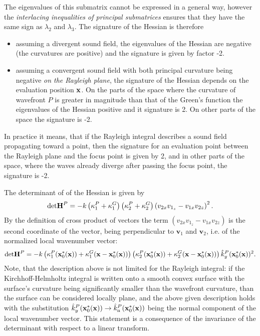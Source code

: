 The eigenvalues of this submatrix cannot be expressed in a general way, however the \emph{interlacing inequalities of principal submatrices}
ensures that they have the same sign as $\lambda_2$ and $\lambda_3$.
The signature of the Hessian is therefore 
\begin{itemize}
\item assuming a divergent sound field, the eigenvalues of the Hessian are negative (the curvatures are positive) and the signature is given by factor -2.
\item assuming a convergent sound field with both principal curvature being negative \emph{on the Rayleigh plane}, the signature of the Hessian depends on the evaluation position $\mathbf{x}$.
On the parts of the space where the curvature of wavefront $P$ is greater in magnitude than that of the Green's function the eigenvalues of the Hessian positive and it signature is 2.
On other parts of the space the signature is -2.
\end{itemize}
In practice it means, that if the Rayleigh integral describes a sound field propagating toward a point, then the signature for an evaluation point between the Rayleigh plane and the focus point is given by 2, and in other parts of the space, where the waves already diverge after passing the focus point, the signature is -2.

The determinant of of the Hessian is given by
\begin{equation}
\mathrm{det} \mathbf{H}^P  = -k \left( \kappa_1^P+\kappa_1^G \right) \left( \kappa_2^P+\kappa_2^G \right) \left( v_{2 x} v_{1_z} - v_{1 x} v_{2 z} \right)^2.
\end{equation}
By the definition of cross product of vectors the term $\left( v_{2 x} v_{1_z} - v_{1 x} v_{2 z} \right)$ is the second coordinate of the vector, being perpendicular to $\mathbf{v}_1$ and $\mathbf{v}_2$, i.e. of the normalized local wavenumber vector:
\begin{equation}
\mathrm{det} \mathbf{H}^P  = -k \left( \kappa_1^P(\mathbf{x}_0^*(\mathbf{x}))+\kappa_1^G(\mathbf{x}-\mathbf{x}_0^*(\mathbf{x})) \right) \left( \kappa_2^P(\mathbf{x}_0^*(\mathbf{x}))+\kappa_2^G(\mathbf{x}-\mathbf{x}_0^*(\mathbf{x})) \right) \hat{k}_y^P(\mathbf{x}_0^*(\mathbf{x}))^2.
\end{equation}
Note, that the description above is not limited for the Rayleigh integral: if the Kirchhoff-Helmholtz integral is written onto a smooth convex surface with the surface's curvature being significantly smaller than the wavefront curvature, than the surface can be considered locally plane, and the above given description holds with the substitution $\hat{k}_y^P(\mathbf{x}_0^*(\mathbf{x})) \rightarrow \hat{k}_{\mathrm{n}}^P(\mathbf{x}_0^*(\mathbf{x}))$ being the normal component of the local wavenumber vector.
This statement is a consequence of the invariance of the determinant with respect to a linear transform.
	
